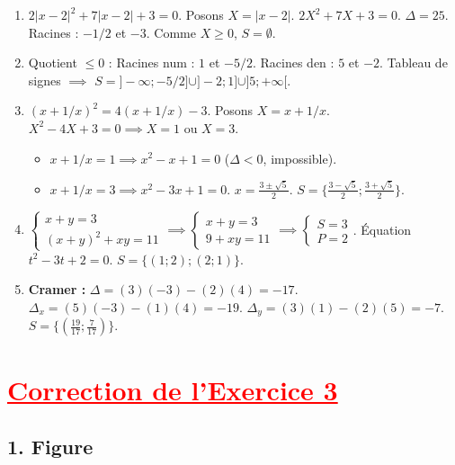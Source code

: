 \documentclass[12pt,a4paper]{article}
\begin{document}
\begin{enumerate}
    \item $2|x - 2|^2 + 7|x - 2| + 3 = 0$. Posons $X = |x-2|$. $2X^2 + 7X + 3 = 0$. $\Delta = 25$. Racines : $-1/2$ et $-3$. Comme $X \geq 0$, \textbf{$S = \emptyset$}.
    
    \item Quotient $\leq 0$ : Racines num : $1$ et $-5/2$. Racines den : $5$ et $-2$. 
    Tableau de signes $\implies$ \textbf{$S = ]-\infty ; -5/2] \cup ]-2 ; 1] \cup ]5 ; +\infty[$}.
    
    \item $(x + 1/x)^2 = 4(x + 1/x) - 3$. Posons $X = x + 1/x$. $X^2 - 4X + 3 = 0 \implies X=1$ ou $X=3$.
    \begin{itemize}
        \item $x + 1/x = 1 \implies x^2 - x + 1 = 0$ ($\Delta < 0$, impossible).
        \item $x + 1/x = 3 \implies x^2 - 3x + 1 = 0$. $x = \frac{3 \pm \sqrt{5}}{2}$. \textbf{$S = \{\frac{3 - \sqrt{5}}{2} ; \frac{3 + \sqrt{5}}{2}\}$}.
    \end{itemize}

    \item $\begin{cases} x + y = 3 \\ (x+y)^2 + xy = 11 \end{cases} \implies \begin{cases} x + y = 3 \\ 9 + xy = 11 \end{cases} \implies \begin{cases} S = 3 \\ P = 2 \end{cases}$. Équation $t^2 - 3t + 2 = 0$. \textbf{$S = \{(1;2) ; (2;1)\}$}.
    
    \item \textbf{Cramer :} $\Delta = (3)(-3) - (2)(4) = -17$. $\Delta_x = (5)(-3) - (1)(4) = -19$. $\Delta_y = (3)(1) - (2)(5) = -7$. \\
    \textbf{$S = \{(\frac{19}{17} ; \frac{7}{17})\}$}.
\end{enumerate}

\section*{\textcolor{red}{\underline{Correction de l'Exercice 3}}}

\subsection*{1. Figure}
\end{document}
